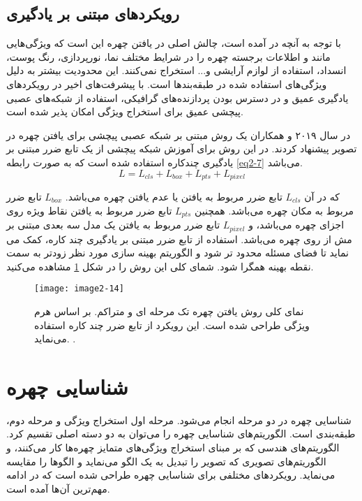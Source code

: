  \subsection{رویکردهای مبتنی بر یادگیری}
با توجه به آنچه در \cite{8253595} آمده است، چالش اصلی در یافتن چهره این است که ویژگی‌هایی مانند  و  اطلاعات برجسته چهره را در شرایط مختلف نما، نورپردازی، رنگ پوست، انسداد، استفاده از لوازم آرایشی و... استخراج نمی‌کنند. این محدودیت بیشتر به دلیل ویژگی‌های استفاده شده در طبقه‌بندها است. با پیشرفت‌های اخیر در رویکردهای یادگیری عمیق و در دسترس بودن پردازنده‌های گرافیکی، استفاده از شبکه‌های عصبی پیچشی عمیق برای استخراج ویژگی امکان پذیر شده است. 

\noindent
در سال ۲۰۱۹  و همکاران \cite{deng2019retinaface} یک روش مبتنی بر شبکه عصبی پیچشی برای یافتن چهره در تصویر پیشنهاد کردند.‌ در این روش برای آموزش شبکه پیچشی از یک تابع ضرر مبتنی بر یادگیری چندکاره  استفاده شده است که به صورت رابطه \ref{eq2-7} می‌باشد.
\begin{equation}\label{eq2-7}
L = L_{cls} + L_{box} + L_{pts} + L_{pixel}  
\end{equation}

\noindent
که در آن $L_{cls}$ تابع ضرر مربوط به یافتن یا عدم یافتن چهره می‌باشد. $L_{box}$ تابع ضرر مربوط به مکان چهره می‌باشد. همچنین $L_{pts}$ تابع ضرر مربوط به یافتن نقاط ویژه روی اجزای چهره می‌باشد، و $L_{pixel}$ تابع ضرر مربوط به یافتن یک مدل سه بعدی مبتنی بر مش از روی چهره می‌باشد. استفاده از تابع ضرر مبتنی بر یادگیری چند کاره، کمک می نماید تا فضای مسئله محدود تر شود و الگوریتم بهینه سازی مورد نظر زودتر به سمت نقطه بهینه همگرا شود. شمای کلی این روش را در شکل \ref{image2-14} مشاهده می‌کنید. 

\begin{figure}[h]
\centering
  \texttt{[image: image2-14]}
  \caption{
نمای کلی روش یافتن چهره تک مرحله ای و متراکم.   بر اساس هرم ویژگی طراحی شده است. این رویکرد از تابع ضرر چند کاره استفاده می‌نماید.
 \cite{deng2019retinaface}.}
  \label{image2-14}
\end{figure}

\section{شناسایی چهره}
شناسایی چهره در دو مرحله انجام می‌شود. مرحله اول استخراج ویژگی و مرحله دوم، طبقه‌بندی است. الگوریتم‌های شناسایی چهره را می‌توان به دو دسته اصلی تقسیم کرد. الگوریتم‌های هندسی که بر مبنای استخراج ویژگی‌های متمایز چهره‌ها کار می‌کنند، و الگوریتم‌های تصویری که تصویر را تبدیل به یک الگو می‌نماید و الگوها را مقایسه می‌نماید. رویکردهای مختلفی برای شناسایی چهره طراحی شده است که در ادامه مهم‌ترین آن‌ها آمده است.

